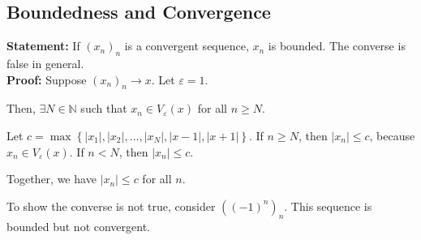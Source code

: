 \documentclass[10pt]{extarticle}
\newcommand{\N}{\mathbb{N}}
\begin{document}
    \subsection{Boundedness and Convergence}%
    \textbf{Statement:} If $\left(x_n\right)_n$ is a convergent sequence, $x_n$ is bounded. The converse is false in general.\\

    \textbf{Proof:} Suppose $\left(x_n\right)_n \rightarrow x$. Let $\varepsilon = 1$.\newline

    Then, $\exists N\in\N$ such that $x_n\in V_{\varepsilon}(x)$ for all $n\geq N$.\newline

    Let $c = \max\left\{|x_1|,|x_2|,\dots,|x_N|,|x-1|,|x+1|\right\}$. If $n\geq N$, then $|x_n| \leq c$, because $x_n \in V_{\varepsilon}(x)$. If $n < N$, then $|x_n| \leq c$.\newline

    Together, we have $|x_n| \leq c$ for all $n$.\newline

    To show the converse is not true, consider $\left((-1)^n\right)_n$. This sequence is bounded but not convergent.
\end{document}
